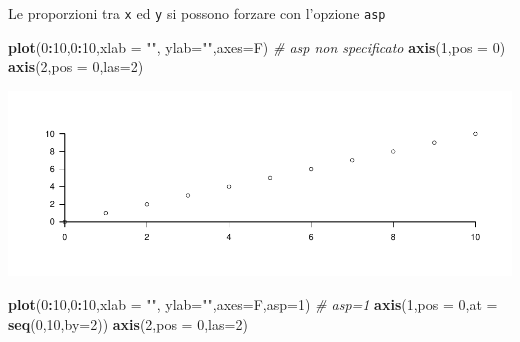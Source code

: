 \documentclass[
  11pt,
]{book}
\newenvironment{Shaded}{\begin{snugshade}}{\end{snugshade}}
\newcommand{\AttributeTok}[1]{\textcolor[rgb]{0.13,0.29,0.53}{#1}}
\newcommand{\CommentTok}[1]{\textcolor[rgb]{0.56,0.35,0.01}{\textit{#1}}}
\newcommand{\DecValTok}[1]{\textcolor[rgb]{0.00,0.00,0.81}{#1}}
\newcommand{\FunctionTok}[1]{\textcolor[rgb]{0.13,0.29,0.53}{\textbf{#1}}}
\newcommand{\NormalTok}[1]{#1}
\newcommand{\SpecialCharTok}[1]{\textcolor[rgb]{0.81,0.36,0.00}{\textbf{#1}}}
\newcommand{\StringTok}[1]{\textcolor[rgb]{0.31,0.60,0.02}{#1}}
\theoremstyle{mytheoremstyle}
\theoremstyle{mydefstyle}
\begin{document}
Le proporzioni tra \texttt{x} ed \texttt{y} si possono forzare con l'opzione \texttt{asp}

\begin{Shaded}
\begin{Highlighting}[]
\FunctionTok{plot}\NormalTok{(}\DecValTok{0}\SpecialCharTok{:}\DecValTok{10}\NormalTok{,}\DecValTok{0}\SpecialCharTok{:}\DecValTok{10}\NormalTok{,}\AttributeTok{xlab =} \StringTok{""}\NormalTok{, }\AttributeTok{ylab=}\StringTok{""}\NormalTok{,}\AttributeTok{axes=}\NormalTok{F) }\CommentTok{\# asp non specificato}
\FunctionTok{axis}\NormalTok{(}\DecValTok{1}\NormalTok{,}\AttributeTok{pos =} \DecValTok{0}\NormalTok{)}
\FunctionTok{axis}\NormalTok{(}\DecValTok{2}\NormalTok{,}\AttributeTok{pos =} \DecValTok{0}\NormalTok{,}\AttributeTok{las=}\DecValTok{2}\NormalTok{)}
\end{Highlighting}
\end{Shaded}

\begin{center}\includegraphics{Appunti_di_Statistica_2025_files/figure-latex/24-Libro-30-1} \end{center}

\begin{Shaded}
\begin{Highlighting}[]
\FunctionTok{plot}\NormalTok{(}\DecValTok{0}\SpecialCharTok{:}\DecValTok{10}\NormalTok{,}\DecValTok{0}\SpecialCharTok{:}\DecValTok{10}\NormalTok{,}\AttributeTok{xlab =} \StringTok{""}\NormalTok{, }\AttributeTok{ylab=}\StringTok{""}\NormalTok{,}\AttributeTok{axes=}\NormalTok{F,}\AttributeTok{asp=}\DecValTok{1}\NormalTok{) }\CommentTok{\# asp=1 }
\FunctionTok{axis}\NormalTok{(}\DecValTok{1}\NormalTok{,}\AttributeTok{pos =} \DecValTok{0}\NormalTok{,}\AttributeTok{at =} \FunctionTok{seq}\NormalTok{(}\DecValTok{0}\NormalTok{,}\DecValTok{10}\NormalTok{,}\AttributeTok{by=}\DecValTok{2}\NormalTok{))}
\FunctionTok{axis}\NormalTok{(}\DecValTok{2}\NormalTok{,}\AttributeTok{pos =} \DecValTok{0}\NormalTok{,}\AttributeTok{las=}\DecValTok{2}\NormalTok{)}
\end{Highlighting}
\end{Shaded}
\end{document}
